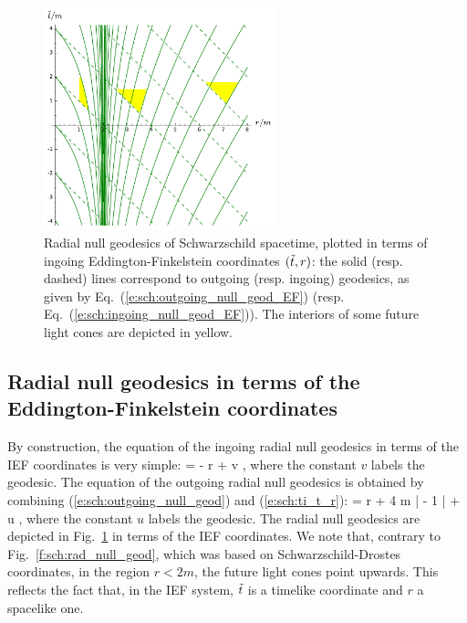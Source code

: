\begin{figure}
\centerline{\includegraphics[width=0.6\textwidth]{sch_rad_null_geod_EF.pdf}}
\caption[]{\label{f:sch:rad_null_geod_EF} \footnotesize
Radial null geodesics of Schwarzschild spacetime, plotted in terms
of ingoing Eddington-Finkelstein coordinates $({\tilde t},r)$: the solid (resp. dashed) lines
correspond to outgoing (resp. ingoing) geodesics, as given by Eq.~(\ref{e:sch:outgoing_null_geod_EF})
(resp. Eq.~(\ref{e:sch:ingoing_null_geod_EF})). The interiors of some future light
cones are depicted in yellow.}
\end{figure}

\subsection{Radial null geodesics in terms of the Eddington-Finkelstein coordinates}

By construction, the equation of the ingoing radial null geodesics
in terms of the IEF coordinates is very simple:
\be \label{e:sch:ingoing_null_geod_EF}
    \ti = - r + v ,
\ee
where the constant $v$ labels the geodesic.
The equation of the outgoing radial null geodesics is obtained
by combining (\ref{e:sch:outgoing_null_geod}) and (\ref{e:sch:ti_t_r}):
\be \label{e:sch:outgoing_null_geod_EF}
    \ti = r + 4 m \ln \left|  - 1 \right| + u ,
\ee
where the constant $u$ labels the geodesic.
The radial null geodesics are depicted in Fig.~\ref{f:sch:rad_null_geod_EF}
in terms of the IEF coordinates. We note that, contrary to Fig.~\ref{f:sch:rad_null_geod},
which was based on Schwarzschild-Drostes coordinates, in the region $r<2m$,
the future light cones point upwards. This reflects the fact that, in the IEF system,
${\tilde t}$ is a timelike coordinate and $r$ a spacelike one.


